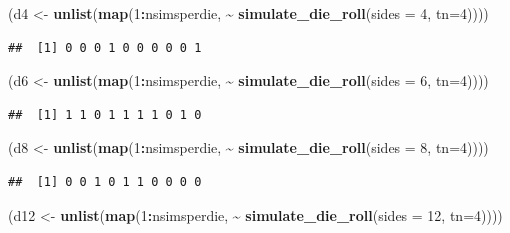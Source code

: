 \documentclass[
]{book}
\newenvironment{Shaded}{\begin{snugshade}}{\end{snugshade}}
\newcommand{\DataTypeTok}[1]{\textcolor[rgb]{0.13,0.29,0.53}{#1}}
\newcommand{\DecValTok}[1]{\textcolor[rgb]{0.00,0.00,0.81}{#1}}
\newcommand{\KeywordTok}[1]{\textcolor[rgb]{0.13,0.29,0.53}{\textbf{#1}}}
\newcommand{\NormalTok}[1]{#1}
\newcommand{\OperatorTok}[1]{\textcolor[rgb]{0.81,0.36,0.00}{\textbf{#1}}}
\newcommand{\StringTok}[1]{\textcolor[rgb]{0.31,0.60,0.02}{#1}}
\begin{document}
\begin{Shaded}
\begin{Highlighting}[]
\NormalTok{(d4 \textless{}{-}}\StringTok{ }\KeywordTok{unlist}\NormalTok{(}\KeywordTok{map}\NormalTok{(}\DecValTok{1}\OperatorTok{:}\NormalTok{nsimsperdie, }\OperatorTok{\textasciitilde{}}\StringTok{ }\KeywordTok{simulate\_die\_roll}\NormalTok{(}\DataTypeTok{sides =} \DecValTok{4}\NormalTok{, }\DataTypeTok{tn=}\DecValTok{4}\NormalTok{))))}
\end{Highlighting}
\end{Shaded}

\begin{verbatim}
##  [1] 0 0 0 1 0 0 0 0 0 1
\end{verbatim}

\begin{Shaded}
\begin{Highlighting}[]
\NormalTok{(d6 \textless{}{-}}\StringTok{ }\KeywordTok{unlist}\NormalTok{(}\KeywordTok{map}\NormalTok{(}\DecValTok{1}\OperatorTok{:}\NormalTok{nsimsperdie, }\OperatorTok{\textasciitilde{}}\StringTok{ }\KeywordTok{simulate\_die\_roll}\NormalTok{(}\DataTypeTok{sides =} \DecValTok{6}\NormalTok{, }\DataTypeTok{tn=}\DecValTok{4}\NormalTok{))))}
\end{Highlighting}
\end{Shaded}

\begin{verbatim}
##  [1] 1 1 0 1 1 1 1 0 1 0
\end{verbatim}

\begin{Shaded}
\begin{Highlighting}[]
\NormalTok{(d8 \textless{}{-}}\StringTok{ }\KeywordTok{unlist}\NormalTok{(}\KeywordTok{map}\NormalTok{(}\DecValTok{1}\OperatorTok{:}\NormalTok{nsimsperdie, }\OperatorTok{\textasciitilde{}}\StringTok{ }\KeywordTok{simulate\_die\_roll}\NormalTok{(}\DataTypeTok{sides =} \DecValTok{8}\NormalTok{, }\DataTypeTok{tn=}\DecValTok{4}\NormalTok{))))}
\end{Highlighting}
\end{Shaded}

\begin{verbatim}
##  [1] 0 0 1 0 1 1 0 0 0 0
\end{verbatim}

\begin{Shaded}
\begin{Highlighting}[]
\NormalTok{(d12 \textless{}{-}}\StringTok{ }\KeywordTok{unlist}\NormalTok{(}\KeywordTok{map}\NormalTok{(}\DecValTok{1}\OperatorTok{:}\NormalTok{nsimsperdie, }\OperatorTok{\textasciitilde{}}\StringTok{ }\KeywordTok{simulate\_die\_roll}\NormalTok{(}\DataTypeTok{sides =} \DecValTok{12}\NormalTok{, }\DataTypeTok{tn=}\DecValTok{4}\NormalTok{))))}
\end{Highlighting}
\end{Shaded}
\end{document}
